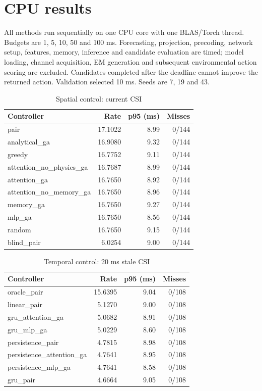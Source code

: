 \documentclass[conference]{IEEEtran}
\begin{document}
\section{CPU results}
All methods run sequentially on one CPU core with one BLAS/Torch thread. Budgets are 1, 5, 10, 50 and 100 ms. Forecasting, projection, precoding, network setup, features, memory, inference and candidate evaluation are timed; model loading, channel acquisition, EM generation and subsequent environmental action scoring are excluded. Candidates completed after the deadline cannot improve the returned action. Validation selected 10 ms. Seeds are 7, 19 and 43.
\begin{table}[t]\centering\caption{Spatial control: current CSI}\small\begin{tabular}{lrrr}\toprule Controller & Rate & p95 (ms) & Misses\\\midrule
pair & 17.1022 & 8.99 & 0/144 \\
analytical\_ga & 16.9080 & 9.32 & 0/144 \\
greedy & 16.7752 & 9.11 & 0/144 \\
attention\_no\_physics\_ga & 16.7687 & 8.99 & 0/144 \\
attention\_ga & 16.7650 & 8.92 & 0/144 \\
attention\_no\_memory\_ga & 16.7650 & 8.96 & 0/144 \\
memory\_ga & 16.7650 & 9.27 & 0/144 \\
mlp\_ga & 16.7650 & 8.56 & 0/144 \\
random & 16.7650 & 9.15 & 0/144 \\
blind\_pair & 6.0254 & 9.00 & 0/144 \\
\bottomrule\end{tabular}\end{table}
\begin{table}[t]\centering\caption{Temporal control: 20 ms stale CSI}\small\begin{tabular}{lrrr}\toprule Controller & Rate & p95 (ms) & Misses\\\midrule
oracle\_pair & 15.6395 & 9.04 & 0/108 \\
linear\_pair & 5.1270 & 9.00 & 0/108 \\
gru\_attention\_ga & 5.0682 & 8.91 & 0/108 \\
gru\_mlp\_ga & 5.0229 & 8.60 & 0/108 \\
persistence\_pair & 4.7815 & 8.98 & 0/108 \\
persistence\_attention\_ga & 4.7641 & 8.95 & 0/108 \\
persistence\_mlp\_ga & 4.7641 & 8.58 & 0/108 \\
gru\_pair & 4.6664 & 9.05 & 0/108 \\
\bottomrule\end{tabular}\end{table}
\end{document}
